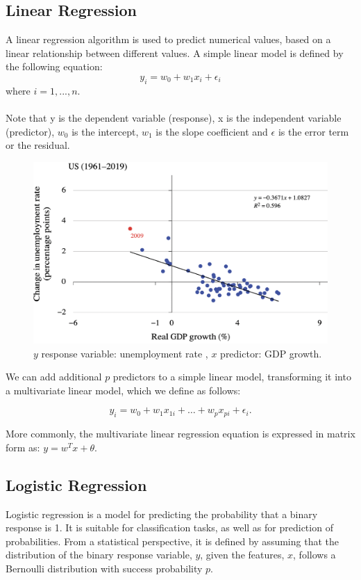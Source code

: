 \documentclass[../main.tex]{subfiles}
\begin{document}
	\subsection{Linear Regression}
	\noindent A linear regression algorithm is used to predict numerical values, based on a linear relationship between different values. A simple linear model is defined by the following equation:
	$$ y_i=  w_0 +w_1 x_i +\epsilon_i  $$
	\noindent where $ i = 1, ..., n$.  \\ \\ 
	Note that y is the dependent variable (response), x is the independent variable (predictor), $w_0$ is the intercept, $w_1$ is the slope coefficient and $\epsilon$ is the error term or the residual. \\ 
	\begin{figure}[h]
		\centering
		\includegraphics[width=0.6\linewidth]{imgs/gdp.png}
		 \caption{\small $y$ response variable: unemployment rate , $x$ predictor: GDP growth.} 
	\end{figure} \mbox{} \par
\vspace{\baselineskip} 
\vspace{\baselineskip} 
\vspace{\baselineskip} 
\noindent We can add additional $p$ predictors to a simple linear model, transforming it into a multivariate linear model, which we define as follows:

$$y_i = w_0 + w_1x_{1i} + \ldots + w_px_{pi} + \epsilon_i. $$

\noindent More commonly, the multivariate linear regression equation is expressed in matrix form as: $y = w^T x + \theta $.



\subsection{Logistic Regression}
\noindent Logistic regression is a model for predicting the probability that a binary response is 1.  It is suitable for classification tasks, as well as for prediction of probabilities.  From a statistical perspective, it is defined by assuming that the distribution of the binary response variable, $y$, given the features, $x$, follows a Bernoulli
distribution with success probability $p$. 
\end{document}
